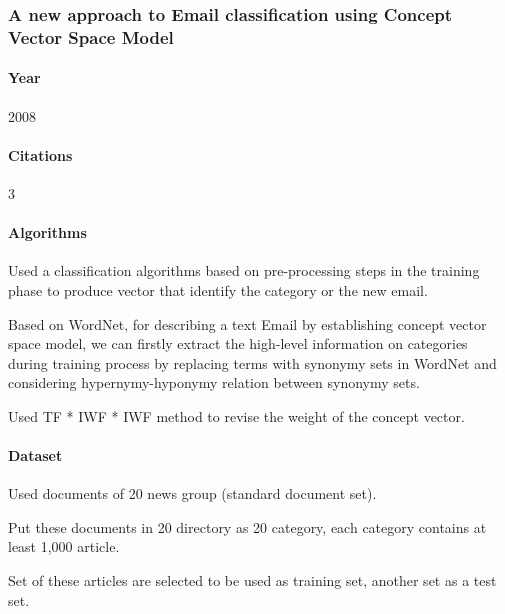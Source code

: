 \documentclass[12pt]{article}
\newenvironment{my_itemize}
{\begin{itemize}
  \setlength{\itemsep}{0cm}
  \setlength{\parskip}{0cm}}
{\end{itemize}}
\begin{document}
\subsubsection{A new approach to Email classification using Concept Vector Space Model \cite{CHAO08}} 

\paragraph{Year} 2008
\paragraph{Citations} 3
\paragraph{Algorithms}
\begin{my_itemize}
  \item Used a classification algorithms based on pre-processing steps in the 
	training phase to produce vector that identify the category or the new email.
  \item Based on WordNet, for describing a text Email by establishing concept vector
	space model, we can firstly extract the high-level information on categories
	during training process by replacing terms with synonymy sets in WordNet and
	considering hypernymy-hyponymy relation between synonymy sets.
  \item Used TF * IWF * IWF method to revise the weight of the concept vector.
\end{my_itemize}

\paragraph{Dataset}
\begin{my_itemize} \setlength{\itemsep}{0cm}%
  \setlength{\parskip}{0cm}%
  \item Used documents of 20 news group (standard document set).
  \item Put these documents in 20 directory as 20 category, each category contains at least 1,000 article.
  \item Set of these articles are selected to be used as training set, another set as a test set.
\end{my_itemize}
\end{document}

